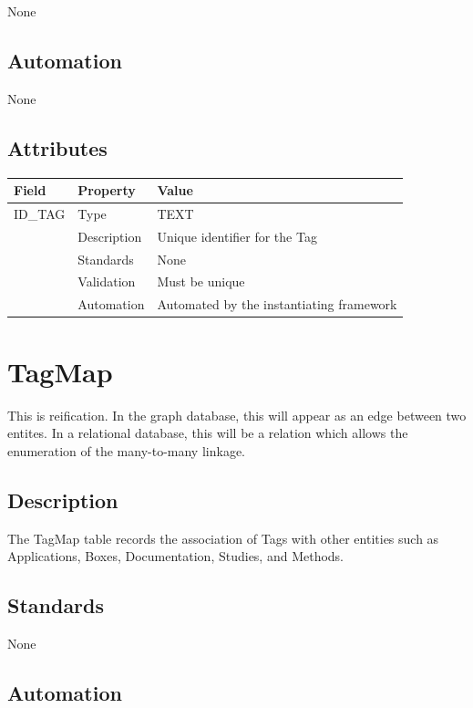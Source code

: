 None

\subsection{Automation}\label{automation-35}

None

\subsection{Attributes}\label{attributes-30}

\begin{longtable}[]{@{}lll@{}}
\toprule\noalign{}
Field & Property & Value \\
\midrule\noalign{}
\endhead
\bottomrule\noalign{}
\endlastfoot
ID\_TAG & Type & TEXT \\
& Description & Unique identifier for the Tag \\
& Standards & None \\
& Validation & Must be unique \\
& Automation & Automated by the instantiating framework \\
\end{longtable}

\section{TagMap}\label{tagmap}

This is reification. In the graph database, this will appear as an edge
between two entites. In a relational database, this will be a relation
which allows the enumeration of the many-to-many linkage.

\subsection{Description}\label{description-34}

The TagMap table records the association of Tags with other entities
such as Applications, Boxes, Documentation, Studies, and Methods.

\subsection{Standards}\label{standards-36}

None

\subsection{Automation}\label{automation-36}


